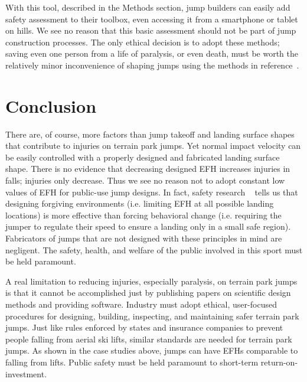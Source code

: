 \documentclass[smallextended]{svjour3}       %
\begin{document}
With
this tool, described in the Methods section, jump builders can easily add safety
assessment to their toolbox, even accessing it from a smartphone or tablet on hills.  We
see no reason that this basic assessment should not be part of jump
construction processes. The only ethical decision is to adopt these methods;
saving even one person from a life of paralysis, or even death, must be worth
the relatively minor inconvenience of shaping jumps using the methods in
reference~\cite{Levy2015}.

\section{Conclusion}
\label{sec:conc}
%
There are, of course, more factors than jump takeoff and landing surface shapes that
contribute to injuries on terrain park jumps. Yet normal impact velocity can be easily
controlled with a properly designed and fabricated landing surface shape. There is no evidence that
decreasing designed EFH increases injuries in falls; injuries only decrease.  Thus
we see no reason not to adopt constant low values of EFH for public-use jump
designs. In fact, safety research ~\cite{Smith2020} tells us that designing forgiving environments (i.e. limiting EFH at all possible landing locations) is more effective than forcing behavioral change (i.e. requiring the jumper to regulate their speed to ensure a landing only in a small safe region).
Fabricators of jumps that are not designed with these principles in mind are
negligent. The safety, health, and welfare of the public involved in this sport
must be held paramount.

A real limitation to reducing injuries, especially paralysis, on terrain park
jumps is that it cannot be accomplished just by publishing papers on scientific
design methods and providing software. Industry must adopt ethical, user-focused procedures
for designing, building, inspecting, and maintaining safer terrain park jumps.
Just like rules enforced by states and insurance companies to prevent people
 falling from aerial ski lifts, similar standards are needed for terrain park
jumps. As shown in the case studies above, jumps can have EFHs comparable to falling from lifts. Public safety
must be held paramount to short-term return-on-investment.
\end{document}
